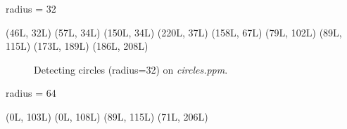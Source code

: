 \documentclass[paper=a4, fontsize=11pt]{scrartcl}
\numberwithin{equation}{section}		%
\numberwithin{figure}{section}			%
\begin{document}
radius = 32

(46L, 32L)
(57L, 34L)
(150L, 34L)
(220L, 37L)
(158L, 67L)
(79L, 102L)
(89L, 115L)
(173L, 189L)
(186L, 208L)

\begin{figure}[h]
\centering
{}
\caption{Detecting circles (radius=32) on \emph{circles.ppm}.}
\label{fig:hough:circle:32}
\end{figure}

radius = 64

(0L, 103L)
(0L, 108L)
(89L, 115L)
(71L, 206L)
\end{document}
